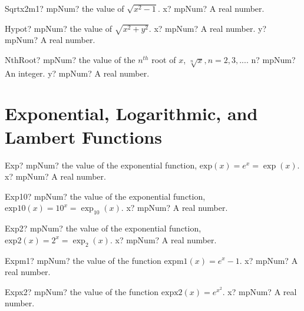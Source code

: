 \documentclass[12pt,a4paper,openany]{book}
\begin{document}
\begin{mpFunctionsExtract}
\mpFunctionOne
{Sqrtx2m1? mpNum? the value of $\sqrt{x^2-1}$.}
{x? mpNum? A real number.}
\end{mpFunctionsExtract}

\begin{mpFunctionsExtract}
\mpFunctionTwo
{Hypot? mpNum? the value of $\sqrt{x^2+y^2}$.}
{x? mpNum? A real number.}
{y? mpNum? A real number.}
\end{mpFunctionsExtract}

\begin{mpFunctionsExtract}
\mpFunctionTwo
{NthRoot? mpNum? the value of the $n^{th}$ root of $x$, $\sqrt[n]{x}, n=2,3,...$.}
{n? mpNum? An integer.}
{y? mpNum? A real number.}
\end{mpFunctionsExtract}

\section{Exponential, Logarithmic, and Lambert Functions}

\begin{mpFunctionsExtract}
\mpFunctionOne
{Exp? mpNum? the value of the exponential function,  $\text{exp}(x) = e^x = \exp(x)$.}
{x? mpNum? A real number.}
\end{mpFunctionsExtract}

\begin{mpFunctionsExtract}
\mpFunctionOne
{Exp10? mpNum? the value of the exponential function, $\text{exp10}(x) = 10^x = \exp_{10}(x)$.}
{x? mpNum? A real number.}
\end{mpFunctionsExtract}

\begin{mpFunctionsExtract}
\mpFunctionOne
{Exp2? mpNum? the value of the exponential function, $\text{exp2}(x) = 2^x = \exp_2(x)$.}
{x? mpNum? A real number.}
\end{mpFunctionsExtract}

\begin{mpFunctionsExtract}
\mpFunctionOne
{Expm1? mpNum? the value of the function $\text{expm1}(x) = e^{x}-1$.}
{x? mpNum? A real number.}
\end{mpFunctionsExtract}

\begin{mpFunctionsExtract}
\mpFunctionOne
{Expx2? mpNum? the value of the function $\text{expx2}(x) = e^{x^2}$.}
{x? mpNum? A real number.}
\end{mpFunctionsExtract}
\end{document}
